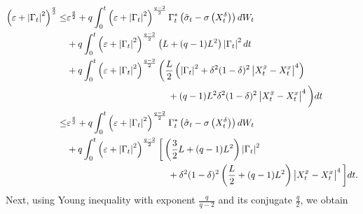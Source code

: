 \documentclass[11pt]{amsart}
\theoremstyle{plain}
\def \dd{{\rm d}}
\numberwithin{equation}{section}
\begin{document}
$$
\begin{aligned}
\left(\varepsilon+\left|\Gamma_{t}\right|^{2}\right)^{\frac{q}{2}}  \leq& \varepsilon^{\frac{q}{2}} +q \int_{0}^{t}\left(\varepsilon+\left|\Gamma_{t}\right|^2 \right)^{\frac{q-2}{2}} \Gamma_{t}^{*}\left(\hat{\sigma}_{t}-\sigma\left(X_{t}^{\delta}\right)\right) \dd W_{t}\\
& +q  \int_{0}^{t}\left(\varepsilon+\left|\Gamma_{t}\right|^{2}\right)^{\frac{q-2}{2}}\left(L+(q-1) L^{2}\right)\left|\Gamma_{t}\right|^{2} \dd t  \\
& + q  \int_{0}^{t}\left(\varepsilon+\left|\Gamma_{t}\right|^{2}\right)^{\frac{q-2}{2}}
\bigg(\frac{ L}{2}\left(\left|\Gamma_{t}\right|^{2}+\delta^2(1-\delta)^2\left|X_{t}^{\bar{x}}-X_{t}^{x}\right|^{4}\right) \\
& \qquad \qquad \qquad \qquad \qquad \quad +(q-1)  L^{2} \delta^2(1-\delta)^2 \left|X_{t}^{\bar{x}}-X_{t}^{x}\right|^{4}\bigg) \dd t   \\
\leq&  \varepsilon^{\frac{q}{2}} +q \int_{0}^{t}\left(\varepsilon+\left|\Gamma_{t}\right|^2 \right)^{\frac{q-2}{2}} \Gamma_{t}^{*}\left(\hat{\sigma}_{t}-\sigma\left(X_{t}^{\delta}\right)\right) \dd W_{t} \\
& +q  \int_{0}^{t}\left(\varepsilon+\left|\Gamma_{t}\right|^{2}\right)^{\frac{q-2}{2}}
\bigg[\left(\frac{3}{2} L+(q-1) L^{2}\right)\left|\Gamma_{t}\right|^{2} \\
& \qquad \qquad \qquad \qquad \qquad \quad 
+\delta^2(1-\delta)^2 \left(\frac{L}{2}
+(q-1) L^{2}\right)\left|X_{t}^{\bar{x}}-X_{t}^{x}\right|^{4}\bigg] \dd t.
\end{aligned}
$$
Next, using Young inequality with exponent $\frac{q}{q-2}$ and its conjugate $\frac{q}{2}$, we obtain
\end{document}
